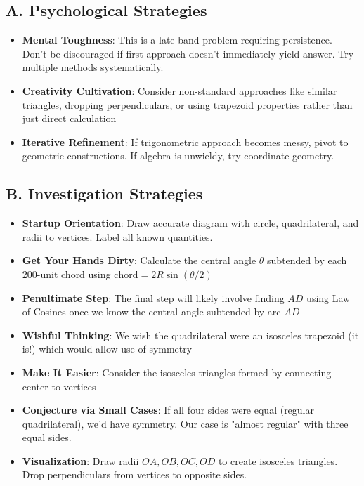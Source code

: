\documentclass[12pt]{article}
\begin{document}
\begin{strategicbox}
\subsection*{A. Psychological Strategies}
\begin{itemize}[leftmargin=*]
    \item \textbf{Mental Toughness}: This is a late-band problem requiring persistence. Don't be discouraged if first approach doesn't immediately yield answer. Try multiple methods systematically.
    \item \textbf{Creativity Cultivation}: Consider non-standard approaches like similar triangles, dropping perpendiculars, or using trapezoid properties rather than just direct calculation
    \item \textbf{Iterative Refinement}: If trigonometric approach becomes messy, pivot to geometric constructions. If algebra is unwieldy, try coordinate geometry.
\end{itemize}

\subsection*{B. Investigation Strategies}
\begin{itemize}[leftmargin=*]
    \item \textbf{Startup Orientation}: Draw accurate diagram with circle, quadrilateral, and radii to vertices. Label all known quantities.
    \item \textbf{Get Your Hands Dirty}: Calculate the central angle $\theta$ subtended by each 200-unit chord using $\text{chord} = 2R\sin(\theta/2)$
    \item \textbf{Penultimate Step}: The final step will likely involve finding $AD$ using Law of Cosines once we know the central angle subtended by arc $AD$
    \item \textbf{Wishful Thinking}: We wish the quadrilateral were an isosceles trapezoid (it is!) which would allow use of symmetry
    \item \textbf{Make It Easier}: Consider the isosceles triangles formed by connecting center to vertices
    \item \textbf{Conjecture via Small Cases}: If all four sides were equal (regular quadrilateral), we'd have symmetry. Our case is "almost regular" with three equal sides.
    \item \textbf{Visualization}: Draw radii $OA, OB, OC, OD$ to create isosceles triangles. Drop perpendiculars from vertices to opposite sides.
\end{itemize}


\end{strategicbox}
\end{document}
